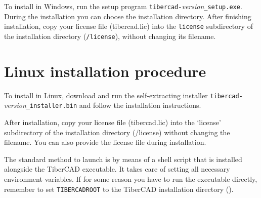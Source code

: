 To install \TiberCAD{} in Windows, run the setup program \verb+tibercad-+\textsl{version}\verb+_setup.exe+.
During the installation you can choose the installation directory. After finishing
installation, copy your license file (tibercad.lic) into the \verb+license+ subdirectory
of the \TiberCAD{} installation directory (\instpath\verb+/license+), without changing
its filename.


\section*{Linux installation procedure}

To install \TiberCAD{} in Linux, download and run the self-extracting installer \verb+tibercad-+\textsl{version}\verb+_installer.bin+ and follow the installation instructions.

After installation, copy your license file (tibercad.lic) into the `license'
subdirectory of the \TiberCAD{} installation directory (\instpath/license) without
changing the filename.
You can also provide the license file during installation.

 The standard method to launch \TiberCAD{} is by means of a shell script that is
installed alongside the TiberCAD executable. It takes care of setting all
necessary environment variables. If for some reason you have to run the executable
directly, remember to set \verb+TIBERCADROOT+ to the TiberCAD installation directory
(\instpath).%






